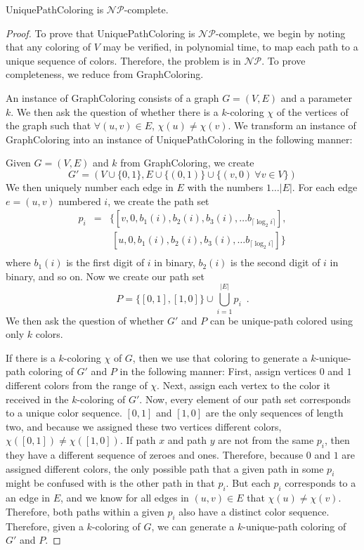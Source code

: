 \documentclass[runningheads]{llncs}
\newcommand{\NP}{\ensuremath{\mathcal{NP}}}
\begin{document}
\begin{theorem}{\sc UniquePathColoring} is \NP-complete.\end{theorem}
\begin{proof}
To prove that {\sc UniquePathColoring} is \NP-complete, we begin by noting that
any coloring of $V$ may be verified, in polynomial time, to map each path to a
unique sequence of colors.  Therefore, the problem is in \NP.  To prove
completeness, we reduce from {\sc GraphColoring}\cite{gandj}.

An instance of {\sc GraphColoring } consists of a graph $G=(V,E)$ and a
parameter $k$.  We then ask the question of whether there is a $k$-coloring
$\chi$ of the vertices of the graph such that $\forall (u,v)\in E$, $\chi(u)
\neq \chi(v)$.  We transform an instance of {\sc GraphColoring} into an
instance of {\sc UniquePathColoring} in the following manner:

Given $G=(V,E)$ and $k$ from {\sc GraphColoring}, we create $$G'=\left(V \cup
\{0,1\}, E \cup \{(0,1)\} \cup \{ (v, 0)~ \forall v \in V\} \right)$$ We then
uniquely number each edge in $E$ with the numbers $1 \ldots |E|$.  For each
edge $e = (u,v)$ numbered $i$, we create the path set 
\begin{eqnarray*}
p_i &=& \{[v,0,b_1(i),b_2(i), b_3(i), \ldots b_{\lceil \log_2 i\rceil}], \\
    & &  ~[u, 0,b_1(i),b_2(i), b_3(i), \ldots b_{\lceil \log_2 i\rceil}]\} \\
\end{eqnarray*}
where $b_1(i)$ is the first digit of $i$ in binary, $b_2(i)$ is the second
digit of $i$ in binary, and so on.  Now we create our path set $$P = \{ [0,1],
[1,0] \} \cup \bigcup_{i = 1}^{|E|} p_i \enspace .$$ We then ask the question
of whether $G'$ and $P$ can be unique-path colored using only $k$ colors.

If there is a $k$-coloring $\chi$ of $G$, then we use that coloring to generate
a $k$-unique-path coloring of $G'$ and $P$ in the following manner: First,
assign vertices $0$ and $1$ different colors from the range of $\chi$.  Next,
assign each vertex to the color it received in the $k$-coloring of $G'$.  Now,
every element of our path set corresponds to a unique color sequence.  $[0,1]$
and $[1,0]$ are the only sequences of length two, and because we assigned these
two vertices different colors, $\chi([0,1]) \neq \chi([1,0])$.  If path $x$ and
path $y$ are not from the same $p_i$, then they have a different sequence of
zeroes and ones.  Therefore, because $0$ and $1$ are assigned different colors,
the only possible path that a given path in some $p_i$ might be confused with
is the other path in that $p_i$.  But each $p_i$ corresponds to a an edge in
$E$, and we know for all edges in $(u,v) \in E$ that $\chi(u) \neq \chi(v)$.
Therefore, both paths within a given $p_i$ also have a distinct color sequence.
Therefore, given a $k$-coloring of $G$, we can generate a $k$-unique-path
coloring of $G'$ and $P$.


\end{proof}
\end{document}
